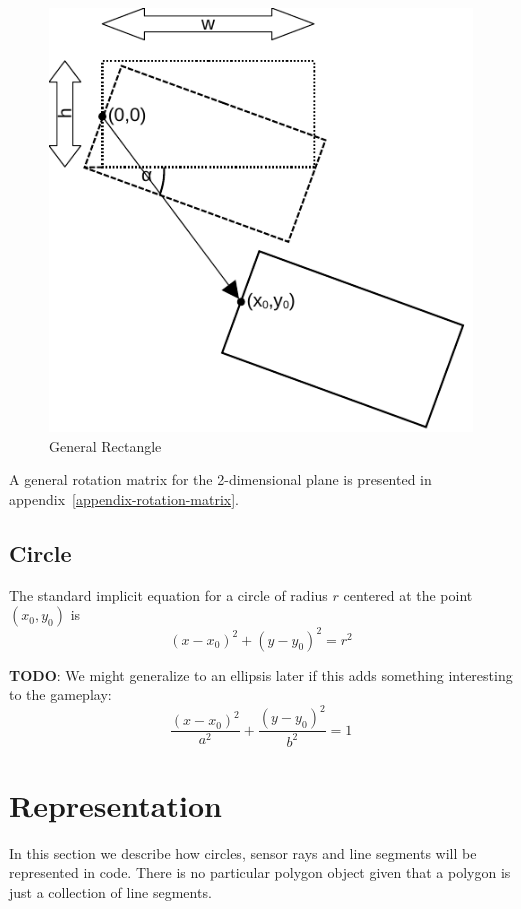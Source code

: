\documentclass[11pt]{article}
\newcommand{\TODO}{{\bf TODO}}
\begin{document}
\begin{figure}
    \centering
    \includegraphics[trim=0 0 0 0]{rectangle.pdf}
    \caption{General Rectangle}\label{fig-rectangle}
\end{figure}

A general rotation matrix for the 2-dimensional plane is presented in
appendix~\ref{appendix-rotation-matrix}.


\subsection{Circle}
\label{sec-circle}

The standard implicit equation for a circle of radius $r$  centered at the
point $(x_0, y_0)$ is
\begin{equation}
    (x - x_0)^2 + (y - y_0)^2 = r^2\label{eq-circle}
\end{equation}

\TODO: We might generalize to an ellipsis later if this adds something
interesting to the gameplay:
\begin{equation}
    \frac{(x-x_0)^2}{a^2} + \frac{(y-y_0)^2}{b^2} = 1
\end{equation}

\section{Representation}
\label{sec-representation}
In this section we describe how circles, sensor rays and line segments will be
represented in code. There is no particular polygon object given that a
polygon is just a collection of line segments.
\end{document}
